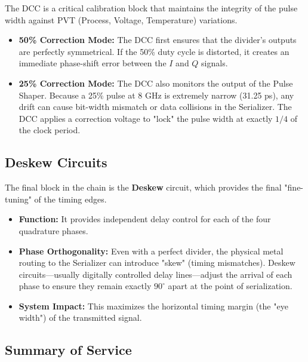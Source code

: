The DCC is a critical calibration block that maintains the integrity of the pulse width against PVT (Process, Voltage, Temperature) variations.

\begin{itemize}
    \item \textbf{50\% Correction Mode:} The DCC first ensures that the divider's outputs are perfectly symmetrical. If the 50\% duty cycle is distorted, it creates an immediate phase-shift error between the \(I\) and \(Q\) signals.
    
    \item \textbf{25\% Correction Mode:} The DCC also monitors the output of the Pulse Shaper. Because a 25\% pulse at 8 GHz is extremely narrow (31.25 ps), any drift can cause bit-width mismatch or data collisions in the Serializer. The DCC applies a correction voltage to "lock" the pulse width at exactly \(1/4\) of the clock period.
\end{itemize}

\subsection{Deskew Circuits}
\label{subsec:deskew-circuits}

The final block in the chain is the \textbf{Deskew} circuit, which provides the final "fine-tuning" of the timing edges.

\begin{itemize}
    \item \textbf{Function:} It provides independent delay control for each of the four quadrature phases.
    
    \item \textbf{Phase Orthogonality:} Even with a perfect divider, the physical metal routing to the Serializer can introduce "skew" (timing mismatches). Deskew circuits—usually digitally controlled delay lines—adjust the arrival of each phase to ensure they remain exactly \(90^\circ\) apart at the point of serialization.
    
    \item \textbf{System Impact:} This maximizes the horizontal timing margin (the "eye width") of the transmitted signal.
\end{itemize}

\subsection{Summary of Service}
\label{subsec:summary-service}

